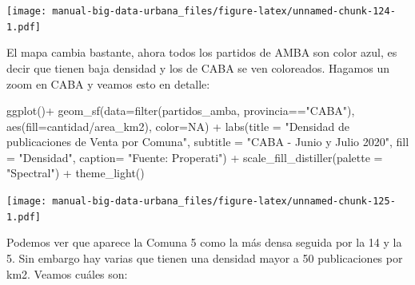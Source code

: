 \documentclass[
  spanish,
]{book}
\newenvironment{Shaded}{\begin{snugshade}}{\end{snugshade}}
\newcommand{\AttributeTok}[1]{\textcolor[rgb]{0.77,0.63,0.00}{#1}}
\newcommand{\ConstantTok}[1]{\textcolor[rgb]{0.00,0.00,0.00}{#1}}
\newcommand{\FunctionTok}[1]{\textcolor[rgb]{0.00,0.00,0.00}{#1}}
\newcommand{\NormalTok}[1]{#1}
\newcommand{\SpecialCharTok}[1]{\textcolor[rgb]{0.00,0.00,0.00}{#1}}
\newcommand{\StringTok}[1]{\textcolor[rgb]{0.31,0.60,0.02}{#1}}
\begin{document}
\texttt{[image: manual-big-data-urbana\_files/figure-latex/unnamed-chunk-124-1.pdf]}

El mapa cambia bastante, ahora todos los partidos de AMBA son color azul, es decir que tienen baja densidad y los de CABA se ven coloreados. Hagamos un zoom en CABA y veamos esto en detalle:

\begin{Shaded}
\begin{Highlighting}[]
\FunctionTok{ggplot}\NormalTok{()}\SpecialCharTok{+}
  \FunctionTok{geom\_sf}\NormalTok{(}\AttributeTok{data=}\FunctionTok{filter}\NormalTok{(partidos\_amba, provincia}\SpecialCharTok{==}\StringTok{"CABA"}\NormalTok{), }\FunctionTok{aes}\NormalTok{(}\AttributeTok{fill=}\NormalTok{cantidad}\SpecialCharTok{/}\NormalTok{area\_km2), }\AttributeTok{color=}\ConstantTok{NA}\NormalTok{) }\SpecialCharTok{+}
    \FunctionTok{labs}\NormalTok{(}\AttributeTok{title =} \StringTok{"Densidad de publicaciones de Venta por Comuna"}\NormalTok{,}
         \AttributeTok{subtitle =} \StringTok{"CABA {-} Junio y Julio 2020"}\NormalTok{,}
         \AttributeTok{fill =} \StringTok{"Densidad"}\NormalTok{,}
         \AttributeTok{caption=} \StringTok{"Fuente: Properati"}\NormalTok{) }\SpecialCharTok{+}
  \FunctionTok{scale\_fill\_distiller}\NormalTok{(}\AttributeTok{palette =} \StringTok{"Spectral"}\NormalTok{) }\SpecialCharTok{+}
  \FunctionTok{theme\_light}\NormalTok{()}
\end{Highlighting}
\end{Shaded}

\texttt{[image: manual-big-data-urbana\_files/figure-latex/unnamed-chunk-125-1.pdf]}

Podemos ver que aparece la Comuna 5 como la más densa seguida por la 14 y la 5. Sin embargo hay varias que tienen una densidad mayor a 50 publicaciones por km2. Veamos cuáles son:
\end{document}
